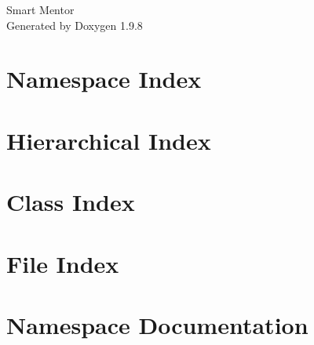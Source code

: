 \documentclass[twoside]{book}
\newcommand{\+}{\discretionary{\mbox{\scriptsize$\hookleftarrow$}}{}{}}
\newcommand{\clearemptydoublepage}{%
    \newpage{\pagestyle{empty}\cleardoublepage}%
  }
\begin{document}
  \raggedbottom
    \hypersetup{pageanchor=false,
                bookmarksnumbered=true,
                pdfencoding=unicode
               }
  \begin{titlepage}
  \vspace*{7cm}
  \begin{center}%
  {\Large Smart Mentor}\\
  \vspace*{1cm}
  {\large Generated by Doxygen 1.9.8}\\
  \end{center}
  \end{titlepage}
  \clearemptydoublepage
  \tableofcontents
  \clearemptydoublepage
  \hypersetup{pageanchor=true}

\chapter{Namespace Index}

\chapter{Hierarchical Index}

\chapter{Class Index}

\chapter{File Index}

\chapter{Namespace Documentation}



\end{document}
